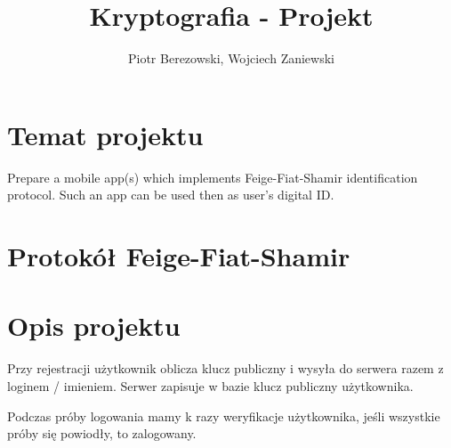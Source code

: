 \documentclass{article}
\title{Kryptografia - Projekt}
\author{Piotr Berezowski, Wojciech Zaniewski}
\begin{document}
	\maketitle
	\newpage


    \section{Temat projektu}

    Prepare a mobile app(s) which implements Feige-Fiat-Shamir identification protocol. Such an app can be used then as user's digital ID.
    
    \section{Protokół Feige-Fiat-Shamir}


    \section{Opis projektu}

    Przy rejestracji użytkownik oblicza klucz publiczny i wysyła do serwera razem z loginem / imieniem. Serwer zapisuje w bazie klucz publiczny 
    użytkownika.

    Podczas próby logowania mamy k razy weryfikacje użytkownika, jeśli wszystkie próby się powiodły, to zalogowany.

    
\end{document}
